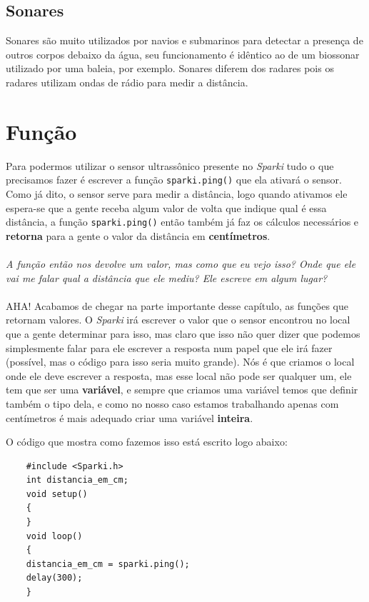     \subsection*{Sonares}
        Sonares são muito utilizados por navios e submarinos para detectar a presença de outros corpos debaixo da água, seu funcionamento é idêntico ao de um biossonar utilizado por uma baleia, por exemplo. Sonares diferem dos radares pois os radares utilizam ondas de rádio para medir a distância.
        
\section{Função}

    Para podermos utilizar o sensor ultrassônico presente no \textit{Sparki} tudo o que precisamos fazer é escrever a função \texttt{sparki.ping()} que ela ativará o sensor. Como já dito, o sensor serve para medir a distância, logo quando ativamos ele espera-se que a gente receba algum valor de volta que indique qual é essa distância, a função \texttt{sparki.ping()} então também já faz os cálculos necessários e \textbf{retorna} para a gente o valor da distância em \textbf{centímetros}.
    \\~\\
    \textit{A função então nos devolve um valor, mas como que eu vejo isso? Onde que ele vai me falar qual a distância que ele mediu? Ele escreve em algum lugar?}
    \\~\\
    AHA! Acabamos de chegar na parte importante desse capítulo, as funções que retornam valores. O \textit{Sparki} irá escrever o valor que o sensor encontrou no local que a gente determinar para isso, mas claro que isso não quer dizer que podemos simplesmente falar para ele escrever a resposta num papel que ele irá fazer (possível, mas o código para isso seria muito grande). Nós é que criamos o local onde ele deve escrever a resposta, mas esse local não pode ser qualquer um, ele tem que ser uma \textbf{variável}, e sempre que criamos uma variável temos que definir também o tipo dela, e como no nosso caso estamos trabalhando apenas com centímetros é mais adequado criar uma variável \textbf{inteira}.
    
    O código que mostra como fazemos isso está escrito logo abaixo:
    
    \begin{verbatim}
    #include <Sparki.h>
    int distancia_em_cm;
    void setup()
    {
    }
    void loop()
    {
    distancia_em_cm = sparki.ping();  
    delay(300);
    }
    \end{verbatim}
    
